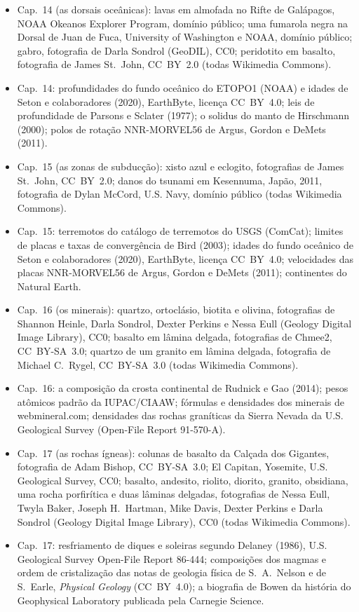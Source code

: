 \begin{itemize}
  \item Cap.~14 (as dorsais oceânicas): lavas em almofada no Rifte de Galápagos, NOAA Okeanos Explorer Program, domínio público; uma fumarola negra na Dorsal de Juan de Fuca, University of Washington e NOAA, domínio público; gabro, fotografia de Darla Sondrol (GeoDIL), CC0; peridotito em basalto, fotografia de James St.~John, CC~BY~2.0 (todas Wikimedia Commons).
  \item Cap.~14: profundidades do fundo oceânico do ETOPO1 (NOAA) e idades de Seton e colaboradores (2020), EarthByte, licença CC~BY~4.0; leis de profundidade de Parsons e Sclater (1977); o solidus do manto de Hirschmann (2000); polos de rotação NNR-MORVEL56 de Argus, Gordon e DeMets (2011).
  \item Cap.~15 (as zonas de subducção): xisto azul e eclogito, fotografias de James St.~John, CC~BY~2.0; danos do tsunami em Kesennuma, Japão, 2011, fotografia de Dylan McCord, U.S. Navy, domínio público (todas Wikimedia Commons).
  \item Cap.~15: terremotos do catálogo de terremotos do USGS (ComCat); limites de placas e taxas de convergência de Bird (2003); idades do fundo oceânico de Seton e colaboradores (2020), EarthByte, licença CC~BY~4.0; velocidades das placas NNR-MORVEL56 de Argus, Gordon e DeMets (2011); continentes do Natural Earth.
  \item Cap.~16 (os minerais): quartzo, ortoclásio, biotita e olivina, fotografias de Shannon Heinle, Darla Sondrol, Dexter Perkins e Nessa Eull (Geology Digital Image Library), CC0; basalto em lâmina delgada, fotografias de Chmee2, CC~BY-SA~3.0; quartzo de um granito em lâmina delgada, fotografia de Michael C.~Rygel, CC~BY-SA~3.0 (todas Wikimedia Commons).
  \item Cap.~16: a composição da crosta continental de Rudnick e Gao (2014); pesos atômicos padrão da IUPAC/CIAAW; fórmulas e densidades dos minerais de webmineral.com; densidades das rochas graníticas da Sierra Nevada da U.S. Geological Survey (Open-File Report 91-570-A).
  \item Cap.~17 (as rochas ígneas): colunas de basalto da Calçada dos Gigantes, fotografia de Adam Bishop, CC~BY-SA~3.0; El Capitan, Yosemite, U.S. Geological Survey, CC0; basalto, andesito, riolito, diorito, granito, obsidiana, uma rocha porfirítica e duas lâminas delgadas, fotografias de Nessa Eull, Twyla Baker, Joseph H.~Hartman, Mike Davis, Dexter Perkins e Darla Sondrol (Geology Digital Image Library), CC0 (todas Wikimedia Commons).
  \item Cap.~17: resfriamento de diques e soleiras segundo Delaney (1986), U.S. Geological Survey Open-File Report 86-444; composições dos magmas e ordem de cristalização das notas de geologia física de S.~A.~Nelson e de S.~Earle, \emph{Physical Geology} (CC~BY~4.0); a biografia de Bowen da história do Geophysical Laboratory publicada pela Carnegie Science.

\end{itemize}
